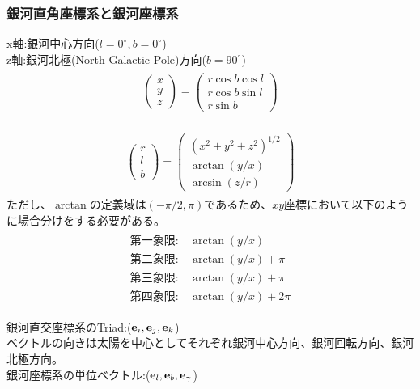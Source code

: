 \subsubsection{銀河直角座標系と銀河座標系}
x軸:銀河中心方向($l=0^{\circ}, b=0^{\circ}$)\\
z軸:銀河北極(North Galactic Pole)方向($b=90^{\circ}$)\\
\begin{align}
\begin{aligned}
	\left(
	\begin{array}{c}
	 	x\\
		y\\
		z
	\end{array}
	\right)
	=
	\left(
	\begin{array}{c}
	 	r\cos{b}\cos{l}\\
	 	r\cos{b}\sin{l}\\
	 	r\sin{b}
	\end{array}
	\right)
\end{aligned}
\end{align}

\begin{align}
\begin{aligned}
	\left(
	\begin{array}{c}
	 	r\\
		l\\
		b
	\end{array}
	\right)
	=
	\left(
	\begin{array}{c}
	 	(x^2 + y^2 + z^2)^{1/2}\\
	 	\arctan{(y/x)}\\
	 	\arcsin{(z/r)}
	\end{array}
	\right)
\end{aligned}
\end{align}
ただし、$\arctan$の定義域は$(-\pi/2, \pi)$であるため、$xy$座標において以下のように場合分けをする必要がある。
\begin{align}
\begin{aligned}
	第一象限 : &\arctan{(y/x)}\\
	第二象限 : &\arctan{(y/x)} + \pi\\
	第三象限 : &\arctan{(y/x)} + \pi\\
	第四象限 : &\arctan{(y/x)} + 2\pi
\end{aligned}
\end{align}


銀河直交座標系のTriad:(${\bf e}_i,{\bf e}_j,{\bf e}_k$)\\
ベクトルの向きは太陽を中心としてそれぞれ銀河中心方向、銀河回転方向、銀河北極方向。\\
銀河座標系の単位ベクトル:(${\bf e}_l,{\bf e}_b,{\bf e}_{\gamma}$)

